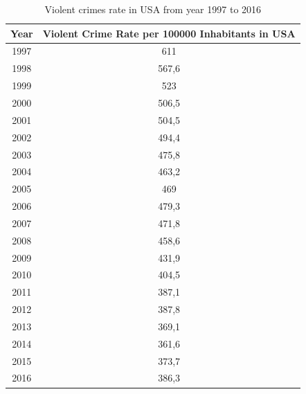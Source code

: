 \documentclass[thesis=B,english]{FITthesis}[2012/10/20]
\begin{document}
\begin{table}[H]
\centering
\def\arraystretch{1.7}%
\captionsetup{justification=centering}
\begin{tabular}{|c|c|}
\hline
\textbf{Year} & \textbf{Violent Crime Rate per 100000 Inhabitants in USA} \\ \hline
1997          & 611                         \\ \hline
1998          & 567,6                       \\ \hline
1999          & 523                         \\ \hline
2000          & 506,5                       \\ \hline
2001          & 504,5                       \\ \hline
2002          & 494,4                       \\ \hline
2003          & 475,8                       \\ \hline
2004          & 463,2                       \\ \hline
2005          & 469                         \\ \hline
2006          & 479,3                       \\ \hline
2007          & 471,8                       \\ \hline
2008          & 458,6                       \\ \hline
2009          & 431,9                       \\ \hline
2010          & 404,5                       \\ \hline
2011          & 387,1                       \\ \hline
2012          & 387,8                       \\ \hline
2013          & 369,1                       \\ \hline
2014          & 361,6                       \\ \hline
2015          & 373,7                       \\ \hline
2016          & 386,3                       \\ \hline
\end{tabular}
\caption{Violent crimes rate in USA from year 1997 to 2016 \cite{tablecrime} }
\label{tab:violence}
\end{table}
\end{document}
